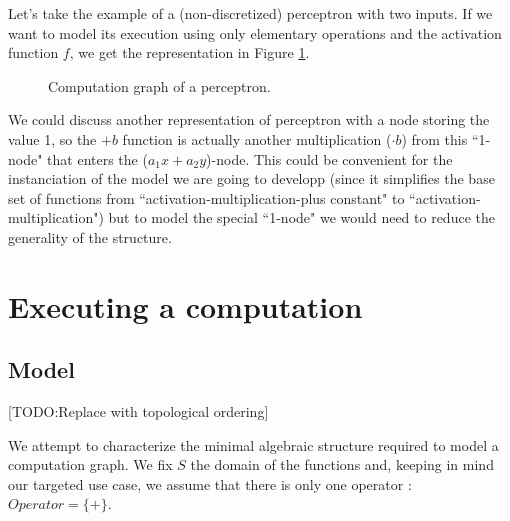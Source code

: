 \documentclass[11pt,a4paper]{article}
\begin{document}
	Let's take the example of a (non-discretized) perceptron with two inputs. If we want to model its execution using only elementary operations and the activation function $f$, we get the representation in Figure \ref{fig:perceptron}.
	
	\begin{figure}[!h]
\label{fig:graph_calc_execution}
\centering
{}
\caption{Computation graph of a perceptron.}
\label{fig:perceptron}
\end{figure}

	We could discuss another representation of perceptron with a node storing the value 1, so the $+b$ function is actually another multiplication ($\cdot b$) from this ``1-node" that enters the ($a_1 x + a_2 y$)-node. This could be convenient for the instanciation of the model we are going to developp (since it simplifies the base set of functions from ``activation-multiplication-plus constant" to ``activation-multiplication") but to model the special ``1-node" we would need to reduce the generality of the structure.

\section{Executing a computation}

\subsection{Model}

[TODO:Replace with topological ordering]

	We attempt to characterize the minimal algebraic structure required to model a computation graph. We fix $S$ the domain of the functions and, keeping in mind our targeted use case, we assume that there is only one operator : $Operator = \{ + \}$. \\
\end{document}
